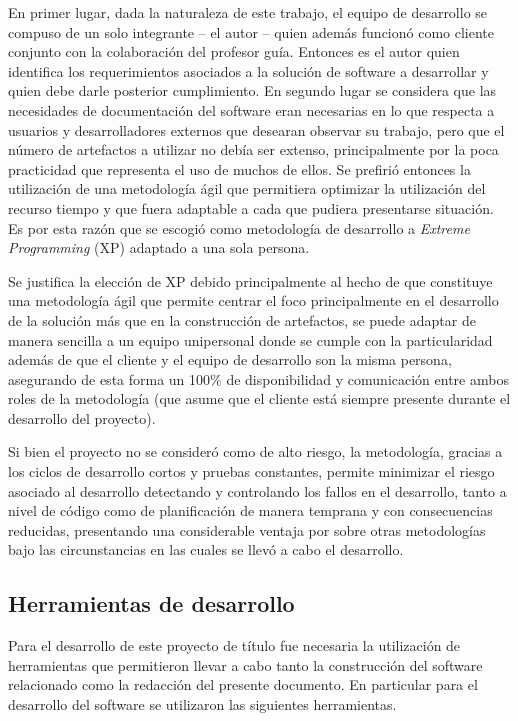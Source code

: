 En primer lugar, dada la naturaleza de este trabajo, el equipo de desarrollo se compuso de un solo integrante – el autor – quien además funcionó como cliente conjunto con la colaboración del profesor guía. Entonces es el autor quien identifica los requerimientos asociados a la solución de software a desarrollar y quien debe darle posterior cumplimiento. En segundo lugar se considera que las necesidades de documentación del software eran necesarias en lo que respecta a usuarios y desarrolladores externos que desearan observar su trabajo, pero que el número de artefactos a utilizar no debía ser extenso, principalmente por la poca practicidad que representa el uso de muchos de ellos. Se prefirió entonces la utilización de una metodología ágil que permitiera optimizar la utilización del recurso tiempo y que fuera adaptable a cada que pudiera presentarse situación. Es por esta razón que se escogió como metodología de desarrollo a \textit{Extreme Programming} (XP) adaptado a una sola persona.

Se justifica la elección de XP debido principalmente al hecho de que constituye una metodología ágil que permite centrar el foco principalmente en el desarrollo de la solución más que en la construcción de artefactos, se puede adaptar de manera sencilla a un equipo unipersonal donde se cumple con la particularidad además de que el cliente y el equipo de desarrollo son la misma persona, asegurando de esta forma un 100\% de disponibilidad y comunicación entre ambos roles de la metodología (que asume que el cliente está siempre presente durante el desarrollo del proyecto).

Si bien el proyecto no se consideró como de alto riesgo, la metodología, gracias a los ciclos de desarrollo cortos y pruebas constantes, permite minimizar el riesgo asociado al desarrollo detectando y controlando los fallos en el desarrollo, tanto a nivel de código como de planificación de manera temprana y con consecuencias reducidas, presentando una considerable ventaja por sobre otras metodologías bajo las circunstancias en las cuales se llevó a cabo el desarrollo.

\subsection{Herramientas de desarrollo}

Para el desarrollo de este proyecto de título fue necesaria la utilización de herramientas que permitieron llevar a cabo tanto la construcción del software relacionado como la redacción del presente documento.
En particular para el desarrollo del software se utilizaron las siguientes herramientas.

